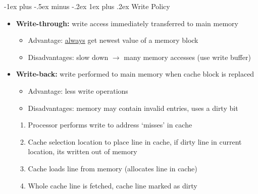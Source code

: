 \documentclass[10pt,landscape]{article}
\makeatletter
\newcommand{\subsubsubsection}{\@startsection{subsubsection}{3}{0mm}%
                                {-1ex plus -.5ex minus -.2ex}%
                                {1ex plus .2ex}%
                                {\normalfont\scriptsize\bfseries}}
\makeatother
\begin{document}
\begin{multicols*}{3}
\subsubsubsection{Write Policy}
\begin{itemize}[topsep=0pt,noitemsep,wide=0pt, leftmargin=\dimexpr{} + 2\relax]
    \item \textbf{Write-through:} write access immediately transferred to main memory
    \begin{itemize}[topsep=0pt,noitemsep,wide=0pt, leftmargin=\dimexpr{} + 2\relax]
        \item Advantage: \underline{always} get newest value of a memory block
        \item Disadvantages: slow down $\rightarrow$ many memory accesses (use write buffer)
    \end{itemize}
    \item \textbf{Write-back:} write performed to main memory when cache block is replaced
    \begin{itemize}[topsep=0pt,noitemsep,wide=0pt, leftmargin=\dimexpr{} + 2\relax]
        \item Advantage: less write operations
        \item Disadvantages: memory may contain invalid entries, uses a dirty bit
    \end{itemize}
    \begin{enumerate}[topsep=0pt,noitemsep,wide=0pt, leftmargin=\dimexpr\labelwidth + 2\labelsep\relax]
        \item Processor performs write to address `misses' in cache
        \item Cache selection location to place line in cache, if dirty line in current location, its written out of memory
        \item Cache loads line from memory (allocates line in cache)
        \item Whole cache line is fetched, cache line marked as dirty
    \end{enumerate}
\end{itemize}


\end{multicols*}
\end{document}
